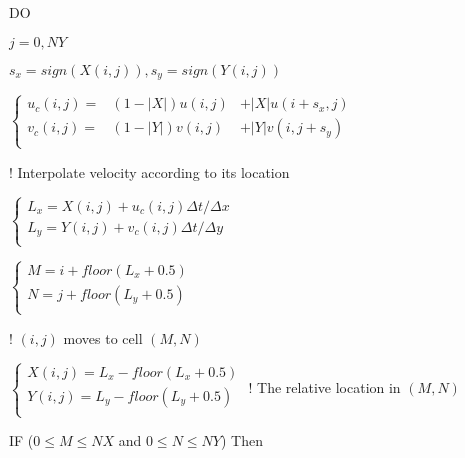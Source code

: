 \documentclass{article}
\theoremstyle{plain}\newtheorem{definition}{\sc{Definition}}
\theoremstyle{defination}\newtheorem{example}{Example}[section]
\numberwithin{equation}{section}
\numberwithin{table}{section}
\begin{document}
{{\hspace{1.1cm} {\color{black!60!blue!80}DO}
{ \color{black!80} $j=0,NY$

\vspace{0.1cm}
 \hspace{1.5cm} $s_x=sign(X(i,j)), s_y=sign(Y(i,j))$

 \hspace{1.5cm}	$\left\{
  \begin{array}{rlr}
u_c(i,j)=&(1-|X|)u(i,j)&+|X|u(i+s_x,j)\\
v_c(i,j)=&(1-|Y|)v(i,j)&+|Y|v(i,j+s_y)\\
	\end{array}
  \right.$}
 \hspace{0.8cm}
   \color{black!60} ! Interpolate velocity according to its location \color{black!80}

 \hspace{1.5cm}	$\left\{
  \begin{array}{l}
	L_x=X(i,j)+u_c(i,j)\Delta t/ \Delta x\\
    L_y=Y(i,j)+v_c(i,j)\Delta t/ \Delta y\\
	\end{array}
	\right.$

 \hspace{1.5cm}	$\left\{
  \begin{array}{l}
	M=i+floor(L_x+0.5)\\
    N=j+floor(L_y+0.5)\\
	\end{array}
  \right.$}
  { \color{black!60} \hspace{3.4cm}
! $(i,j)$ moves to cell $(M,N)$} {\color{black!80}

 \hspace{1.5cm}	$\left\{
  \begin{array}{l}
	X(i,j)=L_x-floor(L_x+0.5)\\
    Y(i,j)=L_y-floor(L_y+0.5)\\
	\end{array}
	\right.$
	{ \color{black!60} \hspace{2.6cm}
! The relative location in $(M,N)$} {\color{black!80}

\vspace{0.1cm}
\hspace{1.5cm} \color{black!60!blue!80} IF
\color{black!70} ($0 \leqslant M \leqslant NX$ and $0 \leqslant N \leqslant NY$)
\color{black!60!blue!80} Then
\color{black!80}
\vspace{0.1cm}

}}}
\end{document}
